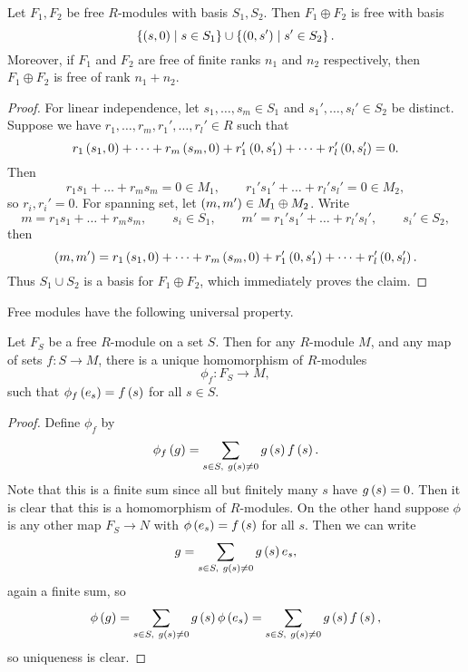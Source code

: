 \begin{proposition}
Let $ F_1, F_2 $ be free $ R $-modules with basis $ S_1, S_2 $. Then $ F_1 \oplus F_2 $ is free with basis
$$ \left\{ \left( s, 0 \right) \mid s \in S_1 \right\} \cup \left\{ \left( 0, s' \right) \mid s' \in S_2 \right\}. $$ Moreover, if $ F_1 $ and $ F_2 $ are free of finite ranks $ n_1 $ and $ n_2 $ respectively, then $ F_1 \oplus F_2 $ is free of rank $ n_1 + n_2 $.
\end{proposition}

\begin{proof}
For linear independence, let $ s_1, \dots, s_m \in S_1 $ and $ s_1', \dots, s_l' \in S_2 $ be distinct. Suppose we have $ r_1, \dots, r_m, r_1', \dots, r_l' \in R $ such that
$$ r_1\left( s_1, 0 \right) + \dots + r_m\left( s_m, 0 \right) + r_1'\left( 0, s_1' \right) + \dots + r_l'\left( 0, s_l' \right) = 0. $$
Then
$$ r_1s_1 + \dots + r_ms_m = 0 \in M_1, \qquad r_1's_1' + \dots + r_l's_l' = 0 \in M_2, $$
so $ r_i, r_i' = 0 $. For spanning set, let $ \left( m, m' \right) \in M_1 \oplus M_2 $. Write
$$ m = r_1s_1 + \dots + r_ms_m, \qquad s_i \in S_1, \qquad m' = r_1's_1' + \dots + r_l's_l', \qquad s_i' \in S_2, $$
then
$$ \left( m, m' \right) = r_1\left( s_1, 0 \right) + \dots + r_m\left( s_m, 0 \right) + r_1'\left( 0, s_1' \right) + \dots + r_l'\left( 0, s_l' \right). $$
Thus $ S_1 \cup S_2 $ is a basis for $ F_1 \oplus F_2 $, which immediately proves the claim.
\end{proof}

Free modules have the following universal property.

\begin{proposition}
Let $ F_S $ be a free $ R $-module on a set $ S $. Then for any $ R $-module $ M $, and any map of sets $ f : S \to M $, there is a unique homomorphism of $ R $-modules
$$ \phi_f : F_S \to M, $$
such that $ \phi_f\left( e_s \right) = f\left( s \right) $ for all $ s \in S $.
\end{proposition}

\begin{proof}
Define $ \phi_f $ by
$$ \phi_f\left( g \right) = \sum_{s \in S, \ g\left( s \right) \ne 0} g\left( s \right)f\left( s \right). $$
Note that this is a finite sum since all but finitely many $ s $ have $ g\left( s \right) = 0 $. Then it is clear that this is a homomorphism of $ R $-modules. On the other hand suppose $ \phi $ is any other map $ F_S \to N $ with $ \phi\left( e_s \right) = f\left( s \right) $ for all $ s $. Then we can write
$$ g = \sum_{s \in S, \ g\rb{s} \ne 0} g\rb{s}e_s, $$
again a finite sum, so
$$ \phi\left( g \right) = \sum_{s \in S, \ g\left( s \right) \ne 0} g\left( s \right)\phi\left( e_s \right) = \sum_{s \in S, \ g\left( s \right) \ne 0} g\left( s \right)f\left( s \right), $$
so uniqueness is clear.
\end{proof}

